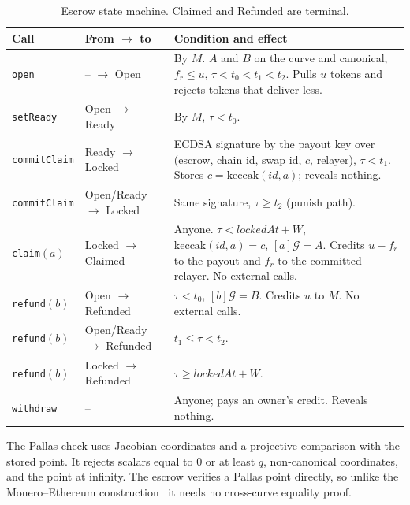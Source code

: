 \documentclass[10pt,letterpaper]{article}
\theoremstyle{plain}
\theoremstyle{definition}
\newcommand{\Gor}{\mathcal{G}}
\newcommand{\fn}[1]{\texttt{#1}}
\newcommand{\st}[1]{\textsf{#1}}
\begin{document}
\begin{table}[H]
\centering\small
\begin{tabularx}{\linewidth}{@{}l l X@{}}
\toprule
\textbf{Call} & \textbf{From} $\to$ \textbf{to} & \textbf{Condition and effect}\\
\midrule
\fn{open} & -- $\to$ \st{Open} & By $M$. $A$ and $B$ on the curve and canonical, $f_r \le u$, $\tau < t_0 < t_1 < t_2$. Pulls $u$ tokens and rejects tokens that deliver less.\\
\fn{setReady} & \st{Open} $\to$ \st{Ready} & By $M$, $\tau < t_0$.\\
\fn{commitClaim} & \st{Ready} $\to$ \st{Locked} & ECDSA signature by the payout key over (escrow, chain id, swap id, $c$, relayer), $\tau < t_1$. Stores $c = \mathrm{keccak}(\mathit{id}, a)$; reveals nothing.\\
\fn{commitClaim} & \st{Open}/\st{Ready} $\to$ \st{Locked} & Same signature, $\tau \ge t_2$ (punish path).\\
\fn{claim}$(a)$ & \st{Locked} $\to$ \st{Claimed} & Anyone. $\tau < \mathit{lockedAt} + W$, $\mathrm{keccak}(\mathit{id},a)=c$, $[a]\Gor = A$. Credits $u-f_r$ to the payout and $f_r$ to the committed relayer. No external calls.\\
\fn{refund}$(b)$ & \st{Open} $\to$ \st{Refunded} & $\tau < t_0$, $[b]\Gor = B$. Credits $u$ to $M$. No external calls.\\
\fn{refund}$(b)$ & \st{Open}/\st{Ready} $\to$ \st{Refunded} & $t_1 \le \tau < t_2$.\\
\fn{refund}$(b)$ & \st{Locked} $\to$ \st{Refunded} & $\tau \ge \mathit{lockedAt} + W$.\\
\fn{withdraw} & -- & Anyone; pays an owner's credit. Reveals nothing.\\
\bottomrule
\end{tabularx}
\caption{Escrow state machine. \st{Claimed} and \st{Refunded} are terminal.}
\label{tab:fsm}
\end{table}

The Pallas check uses Jacobian coordinates and a projective comparison with the stored point. It
rejects scalars equal to $0$ or at least $q$, non-canonical coordinates, and the point at
infinity. The escrow verifies a Pallas point directly, so unlike the Monero--Ethereum
construction~\cite{athanor,mrl10} it needs no cross-curve equality proof.
\end{document}

